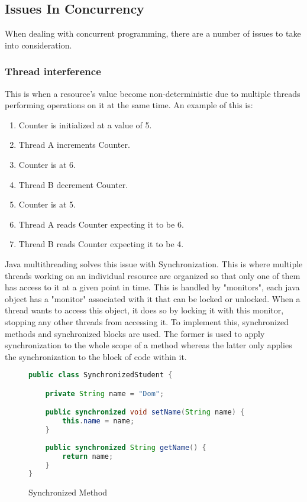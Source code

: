 \documentclass[]{report}
\begin{document}
\subsection{Issues In Concurrency}
When dealing with concurrent programming, there are a number of issues to take into consideration.

\subsubsection{Thread interference}
This is when a resource's value become non-deterministic due to multiple threads performing operations on it at the same time. An example of this is:

\begin{enumerate}
	\item Counter is initialized at a value of 5.
	\item Thread A increments Counter.
	\item Counter is at 6.
	\item Thread B decrement Counter.
	\item Counter is at 5.
	\item Thread A reads Counter expecting it to be 6.
	\item Thread B reads Counter expecting it to be 4.	
\end{enumerate}

Java multithreading solves this issue with Synchronization. This is where multiple threads working on an individual resource are organized so that only one of them has access to it at a given point in time. This is handled by "monitors", each java object has a "monitor" associated with it that can be locked or unlocked. When a thread wants to access this object, it does so by locking it with this monitor, stopping any other threads from accessing it. 
To implement this, synchronized methods and synchronized blocks are used. The former is used to apply synchronization to the whole scope of a method whereas the latter only applies the synchronization to the block of code within it.

\begin{figure}
\caption{Synchronized Method}
\begin{lstlisting}[language=Java,frame=single]
public class SynchronizedStudent {

	private String name = "Dom";

	public synchronized void setName(String name) {
		this.name = name;
	}
	
	public synchronized String getName() {
		return name;
	}
}
\end{lstlisting}
\end{figure}
\end{document}
